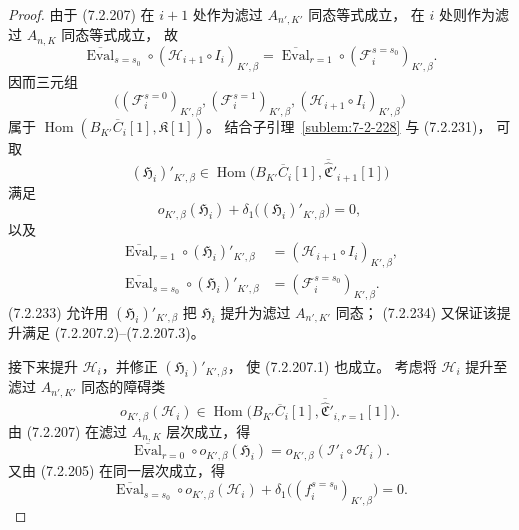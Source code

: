 \begin{proof}
由于 (7.2.207) 在 $i+1$ 处作为滤过
$A_{n',K'}$ 同态等式成立，
在 $i$ 处则作为滤过 $A_{n,K}$ 同态等式成立，
故
\begin{equation}
\overline{\operatorname{Eval}}_{s=s_0}\circ
(\mathcal H_{i+1}\circ I_i)_{K',\beta}
=\overline{\operatorname{Eval}}_{r=1}\circ
(\mathcal F_i^{s=s_0})_{K',\beta}.
\tag{7.2.232}\label{eq:7-2-232}
\end{equation}
因而三元组
\[
\bigl(
(\mathcal F_i^{s=0})_{K',\beta},
(\mathcal F_i^{s=1})_{K',\beta},
(\mathcal H_{i+1}\circ I_i)_{K',\beta}
\bigr)
\]
属于
$\operatorname{Hom}(B_{K'}\overline C_i[1],
\mathfrak K[1])$。
结合子引理~\ref{sublem:7-2-228} 与 (7.2.231)，
可取
\[
(\mathfrak H_i)'_{K',\beta}
\in\operatorname{Hom}\bigl(
B_{K'}\overline C_i[1],
\overline{\widehat{\mathfrak C}}'_{i+1}[1]
\bigr)
\]
满足
\begin{equation}
o_{K',\beta}(\mathfrak H_i)
+\delta_1\bigl((\mathfrak H_i)'_{K',\beta}\bigr)=0,
\tag{7.2.233}\label{eq:7-2-233}
\end{equation}
以及
\begin{align}
\overline{\operatorname{Eval}}_{r=1}\circ
(\mathfrak H_i)'_{K',\beta}
&=(\mathcal H_{i+1}\circ I_i)_{K',\beta},
\tag{7.2.234.1}\label{eq:7-2-234-1}\\
\overline{\operatorname{Eval}}_{s=s_0}\circ
(\mathfrak H_i)'_{K',\beta}
&=(\mathcal F_i^{s=s_0})_{K',\beta}.
\tag{7.2.234.2}\label{eq:7-2-234-2}
\end{align}
(7.2.233) 允许用 $(\mathfrak H_i)'_{K',\beta}$
把 $\mathfrak H_i$ 提升为滤过 $A_{n',K'}$ 同态；
(7.2.234) 又保证该提升满足
(7.2.207.2)--(7.2.207.3)。

接下来提升 $\mathcal H_i$，并修正
$(\mathfrak H_i)'_{K',\beta}$，
使 (7.2.207.1) 也成立。
考虑将 $\mathcal H_i$ 提升至滤过
$A_{n',K'}$ 同态的障碍类
\[
o_{K',\beta}(\mathcal H_i)
\in\operatorname{Hom}\bigl(
B_{K'}\overline C_i[1],
\overline{\widehat{\mathfrak C}}'_{i,r=1}[1]
\bigr).
\]
由 (7.2.207) 在滤过 $A_{n,K}$ 层次成立，得
\begin{equation}
\overline{\operatorname{Eval}}_{r=0}\circ
o_{K',\beta}(\mathfrak H_i)
=o_{K',\beta}(\mathcal I'_i\circ\mathcal H_i).
\tag{7.2.235.1}\label{eq:7-2-235-1}
\end{equation}
又由 (7.2.205) 在同一层次成立，得
\begin{equation}
\overline{\operatorname{Eval}}_{s=s_0}\circ
o_{K',\beta}(\mathcal H_i)
+\delta_1\bigl((f_i^{s=s_0})_{K',\beta}\bigr)=0.
\tag{7.2.235.2}\label{eq:7-2-235-2}
\end{equation}


\end{proof}
